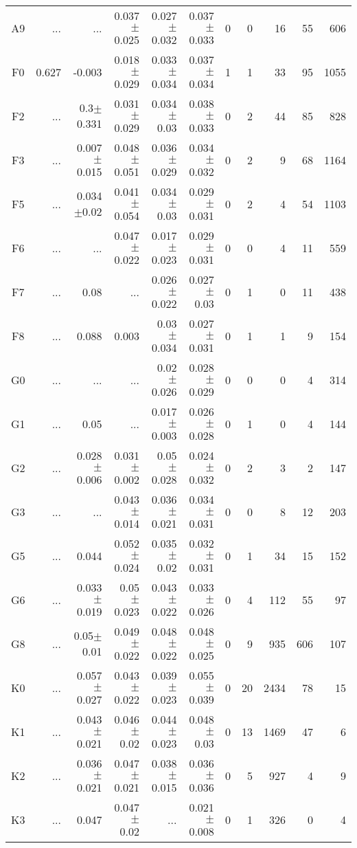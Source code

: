 \begin{table}[t]
\begin{table}[t]
\begin{center}
\begin{tabular}{c|rrrrr|rrrrr}
    A9	&	 ...	&	 ...	&	0.037$\pm$0.025	&	0.027$\pm$0.032	&	0.037$\pm$0.033	&	0	&	0	&	16	&	55	&	606	\\
    F0	&	0.627	&	-0.003	&	0.018$\pm$0.029	&	0.033$\pm$0.034	&	0.037$\pm$0.034	&	1	&	1	&	33	&	95	&	1055	\\
    F2	&	 ...	&	0.3$\pm$0.331	&	0.031$\pm$0.029	&	0.034$\pm$0.03	&	0.038$\pm$0.033	&	0	&	2	&	44	&	85	&	828	\\
    F3	&	 ...	&	0.007$\pm$0.015	&	0.048$\pm$0.051	&	0.036$\pm$0.029	&	0.034$\pm$0.032	&	0	&	2	&	9	&	68	&	1164	\\
    F5	&	 ...	&	0.034$\pm$0.02	&	0.041$\pm$0.054	&	0.034$\pm$0.03	&	0.029$\pm$0.031	&	0	&	2	&	4	&	54	&	1103	\\
    F6	&	 ...	&	 ...	&	0.047$\pm$0.022	&	0.017$\pm$0.023	&	0.029$\pm$0.031	&	0	&	0	&	4	&	11	&	559	\\
    F7	&	 ...	&	0.08	&	 ...	&	0.026$\pm$0.022	&	0.027$\pm$0.03	&	0	&	1	&	0	&	11	&	438	\\
    F8	&	 ...	&	0.088	&	0.003	&	0.03$\pm$0.034	&	0.027$\pm$0.031	&	0	&	1	&	1	&	9	&	154	\\
    G0	&	 ...	&	 ...	&	 ...	&	0.02$\pm$0.026	&	0.028$\pm$0.029	&	0	&	0	&	0	&	4	&	314	\\
    G1	&	 ...	&	0.05	&	 ...	&	0.017$\pm$0.003	&	0.026$\pm$0.028	&	0	&	1	&	0	&	4	&	144	\\
    G2	&	 ...	&	0.028$\pm$0.006	&	0.031$\pm$0.002	&	0.05$\pm$0.028	&	0.024$\pm$0.032	&	0	&	2	&	3	&	2	&	147	\\
    G3	&	 ...	&	 ...	&	0.043$\pm$0.014	&	0.036$\pm$0.021	&	0.034$\pm$0.031	&	0	&	0	&	8	&	12	&	203	\\
    G5	&	 ...	&	0.044	&	0.052$\pm$0.024	&	0.035$\pm$0.02	&	0.032$\pm$0.031	&	0	&	1	&	34	&	15	&	152	\\
    G6	&	 ...	&	0.033$\pm$0.019	&	0.05$\pm$0.023	&	0.043$\pm$0.022	&	0.033$\pm$0.026	&	0	&	4	&	112	&	55	&	97	\\
    G8	&	 ...	&	0.05$\pm$0.01	&	0.049$\pm$0.022	&	0.048$\pm$0.022	&	0.048$\pm$0.025	&	0	&	9	&	935	&	606	&	107	\\
    K0	&	 ...	&	0.057$\pm$0.027	&	0.043$\pm$0.022	&	0.039$\pm$0.023	&	0.055$\pm$0.039	&	0	&	20	&	2434	&	78	&	15	\\
    K1	&	 ...	&	0.043$\pm$0.021	&	0.046$\pm$0.02	&	0.044$\pm$0.023	&	0.048$\pm$0.03	&	0	&	13	&	1469	&	47	&	6	\\
    K2	&	 ...	&	0.036$\pm$0.021	&	0.047$\pm$0.021	&	0.038$\pm$0.015	&	0.036$\pm$0.036	&	0	&	5	&	927	&	4	&	9	\\
    K3	&	 ...	&	0.047	&	0.047$\pm$0.02	&	 ...	&	0.021$\pm$0.008	&	0	&	1	&	326	&	0	&	4	\\

\end{tabular}
\end{center}
\end{table}
\end{table}
